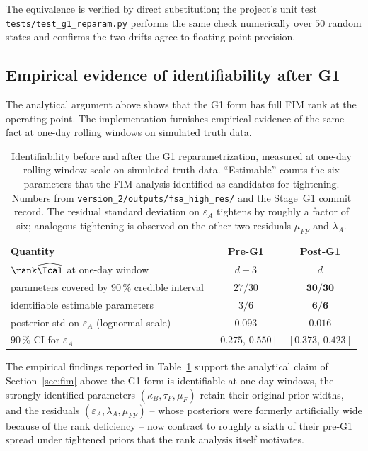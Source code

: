 The equivalence is verified by direct substitution; the project's unit
test \texttt{tests/test\_g1\_reparam.py} performs the same check
numerically over $50$ random states and confirms the two drifts agree
to floating-point precision.

\subsection{Empirical evidence of identifiability after G1}\label{sec:fim-empirical}

The analytical argument above shows that the G1 form has full FIM rank
at the operating point. The implementation furnishes empirical
evidence of the same fact at one-day rolling windows on simulated
truth data.

\begin{table}[h]
\centering
\small
\begin{tabular}{@{}lcc@{}}
\toprule
Quantity & Pre-G1 & Post-G1 \\
\midrule
$\rank \widehat{\Ical}$ at one-day window               & $d-3$            & $d$ \\
parameters covered by 90\,\% credible interval   & $27/30$          & $\mathbf{30/30}$ \\
identifiable estimable parameters                & $3/6$            & $\mathbf{6/6}$ \\
posterior std on $\varepsilon_A$ (lognormal scale) & $0.093$          & $\mathbf{0.016}$ \\
$90\,\%$ CI for $\varepsilon_A$                  & $[0.275,\,0.550]$ & $\mathbf{[0.373,\,0.423]}$ \\
\bottomrule
\end{tabular}
\caption{Identifiability before and after the G1 reparametrization,
measured at one-day rolling-window scale on simulated truth data.
``Estimable'' counts the six parameters that the FIM analysis
identified as candidates for tightening. Numbers from
\texttt{version\_2/outputs/fsa\_high\_res/} and the Stage~G1 commit
record. The residual standard deviation on $\varepsilon_A$ tightens by
roughly a factor of six; analogous tightening is observed on the other
two residuals $\mu_{FF}$ and $\lambda_A$.}
\label{tab:g1-evidence}
\end{table}

The empirical findings reported in Table~\ref{tab:g1-evidence} support
the analytical claim of Section~\ref{sec:fim} above: the G1 form is
identifiable at one-day windows, the strongly identified parameters
$(\kappa_B,\tau_F,\mu_F)$ retain their original prior widths, and the
residuals $(\varepsilon_A,\lambda_A,\mu_{FF})$ -- whose posteriors were
formerly artificially wide because of the rank deficiency -- now
contract to roughly a sixth of their pre-G1 spread under tightened
priors that the rank analysis itself motivates.

